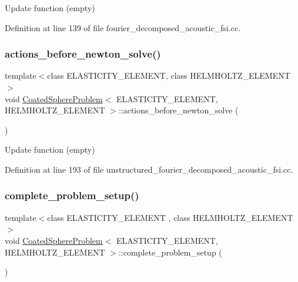 Update function (empty) 



Definition at line 139 of file fourier\+\_\+decomposed\+\_\+acoustic\+\_\+fsi.\+cc.

\mbox{\label{classCoatedSphereProblem_aa268009485d4d2bb6b4856bfa318aaa9}} 
\subsubsection{\texorpdfstring{actions\+\_\+before\+\_\+newton\+\_\+solve()}{actions\_before\_newton\_solve()}\hspace{0.1cm}{\footnotesize\ttfamily [2/2]}}
{\footnotesize\ttfamily template$<$class E\+L\+A\+S\+T\+I\+C\+I\+T\+Y\+\_\+\+E\+L\+E\+M\+E\+NT, class H\+E\+L\+M\+H\+O\+L\+T\+Z\+\_\+\+E\+L\+E\+M\+E\+NT$>$ \\
void \hyperlink{classCoatedSphereProblem}{Coated\+Sphere\+Problem}$<$ E\+L\+A\+S\+T\+I\+C\+I\+T\+Y\+\_\+\+E\+L\+E\+M\+E\+NT, H\+E\+L\+M\+H\+O\+L\+T\+Z\+\_\+\+E\+L\+E\+M\+E\+NT $>$\+::actions\+\_\+before\+\_\+newton\+\_\+solve (\begin{DoxyParamCaption}{ }\end{DoxyParamCaption})\hspace{0.3cm}{\ttfamily [inline]}}



Update function (empty) 



Definition at line 193 of file unstructured\+\_\+fourier\+\_\+decomposed\+\_\+acoustic\+\_\+fsi.\+cc.

\mbox{\label{classCoatedSphereProblem_a7417ba994216c3d817259891176cd392}} 
\subsubsection{\texorpdfstring{complete\+\_\+problem\+\_\+setup()}{complete\_problem\_setup()}}
{\footnotesize\ttfamily template$<$class E\+L\+A\+S\+T\+I\+C\+I\+T\+Y\+\_\+\+E\+L\+E\+M\+E\+NT , class H\+E\+L\+M\+H\+O\+L\+T\+Z\+\_\+\+E\+L\+E\+M\+E\+NT $>$ \\
void \hyperlink{classCoatedSphereProblem}{Coated\+Sphere\+Problem}$<$ E\+L\+A\+S\+T\+I\+C\+I\+T\+Y\+\_\+\+E\+L\+E\+M\+E\+NT, H\+E\+L\+M\+H\+O\+L\+T\+Z\+\_\+\+E\+L\+E\+M\+E\+NT $>$\+::complete\+\_\+problem\+\_\+setup (\begin{DoxyParamCaption}{ }\end{DoxyParamCaption})\hspace{0.3cm}{\ttfamily [private]}}

